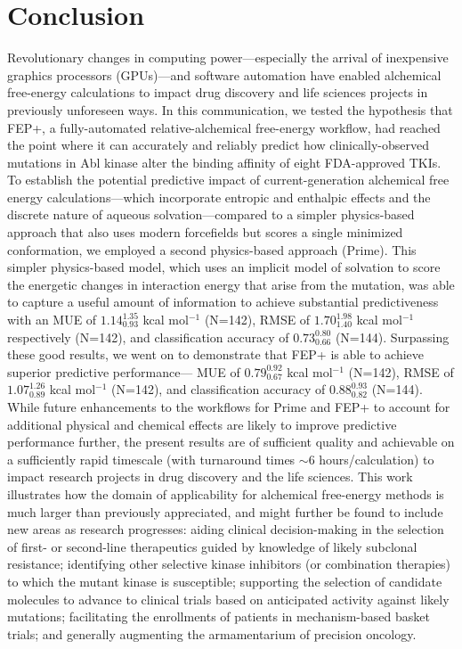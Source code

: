 \documentclass[phd,tocprelim]{cornell}
\begin{document}
%
%
%
%
\section{Conclusion}
Revolutionary changes in computing power---especially the arrival of inexpensive graphics processors (GPUs)---and software automation have enabled alchemical free-energy calculations to impact drug discovery and life sciences projects in previously unforeseen ways.
In this communication, we tested the hypothesis that FEP+, a fully-automated relative-alchemical free-energy workflow,     
had reached the point where it can accurately and reliably predict how clinically-observed mutations in Abl kinase alter the binding affinity of eight FDA-approved TKIs.
To establish the potential predictive impact of current-generation alchemical free energy calculations---which incorporate entropic and enthalpic effects and the discrete nature of aqueous solvation---compared to a simpler physics-based approach that also uses modern forcefields but scores a single minimized conformation, we employed a second physics-based approach (Prime).
This simpler physics-based model, which uses an implicit model of solvation to score the energetic changes in interaction energy that arise from the mutation, was able to capture a useful amount of information to achieve substantial predictiveness with an MUE of $1.14^{1.35}_{0.93}$ kcal mol$^{-1}$ (N=142), RMSE of $1.70^{1.98}_{1.40}$ kcal mol$^{-1}$ respectively (N=142), and classification accuracy of $0.73^{0.80}_{0.66}$ (N=144).
Surpassing these good results, we went on to demonstrate that FEP+ is able to achieve superior predictive performance---
MUE of $0.79^{0.92}_{0.67}$ kcal mol$^{-1}$ (N=142), RMSE of $1.07^{1.26}_{0.89}$ kcal mol$^{-1}$ (N=142), and
classification accuracy of 
$0.88^{0.93}_{0.82}$ (N=144).
While future enhancements to the workflows for Prime and FEP+ to account for additional physical and chemical effects are likely to improve predictive performance further, the present results are of sufficient quality and achievable on a sufficiently rapid timescale (with turnaround times 
$\sim$6 hours/calculation)
to impact research projects in drug discovery and the life sciences.
This work illustrates how the domain of applicability for alchemical free-energy methods is much larger than previously appreciated, and might further be found to include new areas as research progresses: aiding clinical decision-making in the selection of first- or second-line therapeutics guided by knowledge of likely subclonal resistance; identifying other selective kinase inhibitors (or combination therapies) to which the mutant kinase is susceptible; supporting the selection of candidate molecules to advance to clinical trials based on anticipated activity against likely mutations; facilitating the enrollments of patients in mechanism-based basket trials; and generally augmenting the armamentarium of precision oncology.
\end{document}

